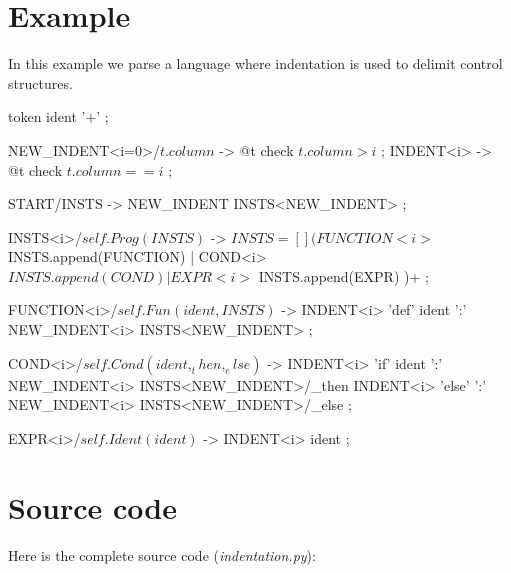 \section{Example}

In this example we parse a language where indentation is used to delimit control structures.

\begin{verbatimtab}[4]
token ident '\w+' ;

NEW_INDENT<i=0>/$t.column$ -> @t check $t.column>i$ ;
INDENT<i> -> @t check $t.column==i$ ;

START/INSTS -> NEW_INDENT INSTS<NEW_INDENT> ;

INSTS<i>/$self.Prog(INSTS)$ ->  $ INSTS = []
    (   FUNCTION<i>             $ INSTS.append(FUNCTION)
    |   COND<i>                 $ INSTS.append(COND)
    |   EXPR<i>                 $ INSTS.append(EXPR)
    )+
;

FUNCTION<i>/$self.Fun(ident, INSTS)$ ->
    INDENT<i> 'def' ident ':'
    NEW_INDENT<i> INSTS<NEW_INDENT>
;

COND<i>/$self.Cond(ident, _then, _else)$ ->
    INDENT<i> 'if' ident ':'
    NEW_INDENT<i> INSTS<NEW_INDENT>/_then
    INDENT<i> 'else' ':'
    NEW_INDENT<i> INSTS<NEW_INDENT>/_else
;

EXPR<i>/$self.Ident(ident)$ -> INDENT<i> ident ;
\end{verbatimtab}

\section{Source code}

Here is the complete source code (\emph{indentation.py}):

